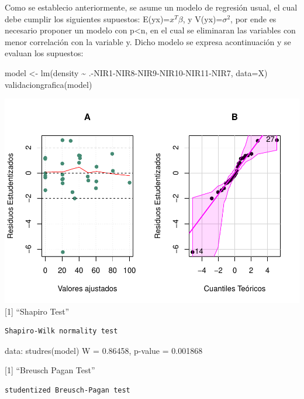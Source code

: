 \documentclass[
]{article}
\newenvironment{Shaded}{\begin{snugshade}}{\end{snugshade}}
\newcommand{\AttributeTok}[1]{\textcolor[rgb]{0.77,0.63,0.00}{#1}}
\newcommand{\FunctionTok}[1]{\textcolor[rgb]{0.00,0.00,0.00}{#1}}
\newcommand{\NormalTok}[1]{#1}
\newcommand{\OtherTok}[1]{\textcolor[rgb]{0.56,0.35,0.01}{#1}}
\newcommand{\SpecialCharTok}[1]{\textcolor[rgb]{0.00,0.00,0.00}{#1}}
\begin{document}
Como se establecio anteriormente, se asume un modelo de regresión usual,
el cual debe cumplir los siguientes supuestos:
E(y\textbar x)=\(x^T\beta\), y V(y\textbar x)=\(\sigma^2\), por ende es
necesario proponer un modelo con p\textless n, en el cual se eliminaran
las variables con menor correlación con la variable y. Dicho modelo se
expresa acontinuación y se evaluan los supuestos:

\begin{Shaded}
\begin{Highlighting}[]
\NormalTok{model }\OtherTok{\textless{}{-}} \FunctionTok{lm}\NormalTok{(density }\SpecialCharTok{\textasciitilde{}}\NormalTok{ .}\SpecialCharTok{{-}}\NormalTok{NIR1}\SpecialCharTok{{-}}\NormalTok{NIR8}\SpecialCharTok{{-}}\NormalTok{NIR9}\SpecialCharTok{{-}}\NormalTok{NIR10}\SpecialCharTok{{-}}\NormalTok{NIR11}\SpecialCharTok{{-}}\NormalTok{NIR7, }\AttributeTok{data=}\NormalTok{X)}
\FunctionTok{validaciongrafica}\NormalTok{(model)}
\end{Highlighting}
\end{Shaded}

\includegraphics{Taller-2-Regresion-Multiple-Aplicada_files/figure-latex/unnamed-chunk-4-1.pdf}
{[}1{]} ``Shapiro Test''

\begin{verbatim}
Shapiro-Wilk normality test
\end{verbatim}

data: studres(model) W = 0.86458, p-value = 0.001868

{[}1{]} ``Breusch Pagan Test''

\begin{verbatim}
studentized Breusch-Pagan test
\end{verbatim}
\end{document}
